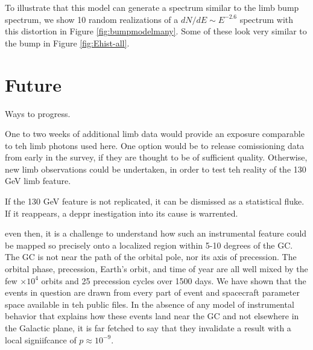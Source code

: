 \documentclass[aps,twocolumn,prd,superscriptaddress,showpacs,nofootinbib,fixfloat]{revtex4}
\begin{document}
To illustrate that this model can generate a spectrum similar to the limb bump
spectrum, we show 10 random realizations of a $dN/dE \sim E^{-2.6}$ spectrum
with this distortion in Figure \ref{fig:bumpmodelmany}.
Some of these look very similar to the bump in Figure \ref{fig:Ehist-all}.


\section{Future}
Ways to progress.

One to two weeks of additional limb data would provide an exposure comparable
to teh limb photons used here.  One option would be to release comissioning
data from early in the survey, if they are thought to be of sufficient
quality.  Otherwise, new limb observations could be undertaken, in order to
test teh reality of the 130 GeV limb feature.  

If the 130 GeV feature is not replicated, it can be dismissed as a statistical
fluke.  If it reappears, a deppr inestigation into its cause is warrented.  

even then, it is a challenge to understand how such an instrumental feature
could be mapped so precisely onto a localized region within 5-10 degrees of
the GC.  The GC is not near the path of the orbital pole, nor its axis of
precession.  The orbital phase, precession, Earth's orbit, and time of year
are all well mixed by the few $\times10^4$ orbits and 25 precession cycles
over 1500 days.  We have shown that the events in question are drawn from
every part of event and spacecraft parameter space available in teh public
files.  In the absence of any model of instrumental behavior that explains how
these events land near the GC and not elsewhere in the Galactic plane, it is
far fetched to say that they invalidate a result with a local signiifcance of
$p\approx10^{-9}$.  




 
\end{document}
